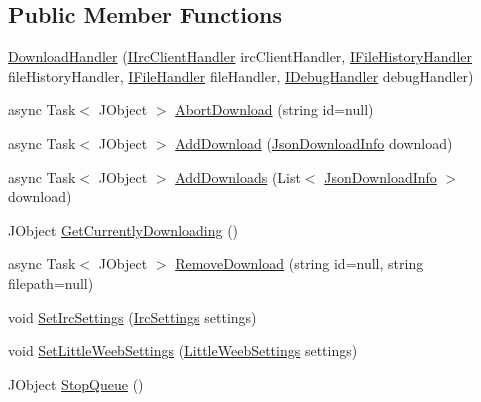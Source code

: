 \subsection*{Public Member Functions}
\begin{DoxyCompactItemize}
\item 
\mbox{\hyperlink{class_little_weeb_library_1_1_handlers_1_1_download_handler_ae98f5b136d09bb9f619bfad68f8d8bf7}{Download\+Handler}} (\mbox{\hyperlink{interface_little_weeb_library_1_1_handlers_1_1_i_irc_client_handler}{I\+Irc\+Client\+Handler}} irc\+Client\+Handler, \mbox{\hyperlink{interface_little_weeb_library_1_1_handlers_1_1_i_file_history_handler}{I\+File\+History\+Handler}} file\+History\+Handler, \mbox{\hyperlink{interface_little_weeb_library_1_1_handlers_1_1_i_file_handler}{I\+File\+Handler}} file\+Handler, \mbox{\hyperlink{interface_little_weeb_library_1_1_handlers_1_1_i_debug_handler}{I\+Debug\+Handler}} debug\+Handler)
\item 
async Task$<$ J\+Object $>$ \mbox{\hyperlink{class_little_weeb_library_1_1_handlers_1_1_download_handler_a5a28664c89bf43b921fc9d3f1845b5a1}{Abort\+Download}} (string id=null)
\item 
async Task$<$ J\+Object $>$ \mbox{\hyperlink{class_little_weeb_library_1_1_handlers_1_1_download_handler_ad28cb47c19cac5e761ceff86ea021a02}{Add\+Download}} (\mbox{\hyperlink{class_little_weeb_library_1_1_models_1_1_json_download_info}{Json\+Download\+Info}} download)
\item 
async Task$<$ J\+Object $>$ \mbox{\hyperlink{class_little_weeb_library_1_1_handlers_1_1_download_handler_ac03f2dc024c0884bb7bd1c68ee03142e}{Add\+Downloads}} (List$<$ \mbox{\hyperlink{class_little_weeb_library_1_1_models_1_1_json_download_info}{Json\+Download\+Info}} $>$ download)
\item 
J\+Object \mbox{\hyperlink{class_little_weeb_library_1_1_handlers_1_1_download_handler_a3d913e57fb5f46a736c02858364609f9}{Get\+Currently\+Downloading}} ()
\item 
async Task$<$ J\+Object $>$ \mbox{\hyperlink{class_little_weeb_library_1_1_handlers_1_1_download_handler_aac22841386d098daef366cbe05262187}{Remove\+Download}} (string id=null, string filepath=null)
\item 
void \mbox{\hyperlink{class_little_weeb_library_1_1_handlers_1_1_download_handler_a6edcb9be7543c9fb587df06c994f50fb}{Set\+Irc\+Settings}} (\mbox{\hyperlink{class_little_weeb_library_1_1_settings_1_1_irc_settings}{Irc\+Settings}} settings)
\item 
void \mbox{\hyperlink{class_little_weeb_library_1_1_handlers_1_1_download_handler_a0ad546188f5b5145dd9b088852cd29f8}{Set\+Little\+Weeb\+Settings}} (\mbox{\hyperlink{class_little_weeb_library_1_1_settings_1_1_little_weeb_settings}{Little\+Weeb\+Settings}} settings)
\item 
J\+Object \mbox{\hyperlink{class_little_weeb_library_1_1_handlers_1_1_download_handler_a8fd807f023ed25e031844da3927e1a23}{Stop\+Queue}} ()
\end{DoxyCompactItemize}
